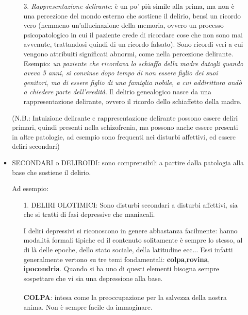 \begin{itemize}
\begin{itemize}
\item[3.]
  \emph{Rappresentazione delirante}: è un po' più simile alla prima, ma
  non è una percezione del mondo esterno che sostiene il delirio, bensì
  un ricordo vero (nemmeno un'allucinazione della memoria, ovvero un
  processo psicopatologico in cui il paziente crede di ricordare cose
  che non sono mai avvenute, trattandosi quindi di un ricordo falsato).
  Sono ricordi veri a cui vengono attribuiti significati abnormi, come
  nella percezione delirante. Esempio: \emph{un paziente che ricordava
  lo schiaffo della madre datogli quando aveva 5 anni, si convinse dopo
  tempo di non essere figlio dei suoi genitori, ma di essere figlio di
  una famiglia nobile, a cui addirittura andò a chiedere parte
  dell'eredità}. Il delirio genealogico nasce da una rappresentazione
  delirante, ovvero il ricordo dello schiaffetto della madre.
\end{itemize}

(N.B.: Intuizione delirante e rappresentazione delirante possono essere
deliri primari, quindi presenti nella schizofrenia, ma possono anche
essere presenti in altre patologie, ad esempio sono frequenti nei
disturbi affettivi, ed essere deliri secondari)

\item
  SECONDARI o DELIROIDI: sono comprensibili a partire dalla patologia
  alla base che sostiene il delirio.

Ad esempio:

\begin{itemize}
\item[1.]
  DELIRI OLOTIMICI: Sono disturbi secondari a disturbi affettivi, sia
  che si tratti di fasi depressive che maniacali.

  I deliri depressivi si riconoscono in genere abbastanza facilmente:
  hanno modalità formali tipiche ed il contenuto solitamente è sempre lo
  stesso, al di là delle epoche, dello stato sociale, della latitudine
  ecc... Essi infatti generalmente vertono su tre temi fondamentali:
  \textbf{colpa},\textbf{rovina}, \textbf{ipocondria}. Quando si ha uno
  di questi elementi bisogna sempre sospettare che vi sia una
  depressione alla base.
\\\\
  \textbf{COLPA}: intesa come la preoccupazione per la salvezza della
  nostra anima. Non è sempre facile da immaginare.


\end{itemize}
\end{itemize}
